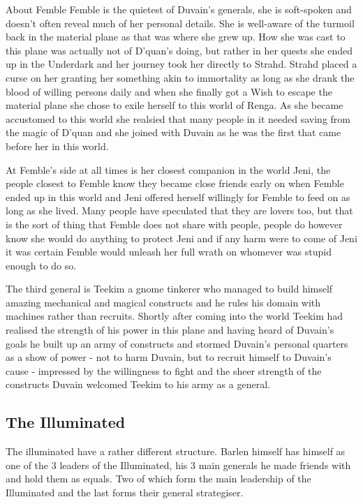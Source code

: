 \documentclass[10pt,twoside,twocolumn]{article}
\begin{document}
\begin{commentbox}{About Femble}
Femble is the quietest of Duvain's generals, she is soft-spoken and doesn't often reveal much of her personal details. She is well-aware of the turmoil back in the material plane as that was where she grew up. How she was cast to this plane was actually not of D'quan's doing, but rather in her quests she ended up in the Underdark and her journey took her directly to Strahd. Strahd placed a curse on her granting her something akin to immortality as long as she drank the blood of willing persons daily and when she finally got a Wish to escape the material plane she chose to exile herself to this world of Renga. As she became accustomed to this world she realsied that many people in it needed saving from the magic of D'quan and she joined with Duvain as he was the first that came before her in this world.

At Femble's side at all times is her closest companion in the world Jeni, the people closest to Femble know they became close friends early on when Femble ended up in this world and Jeni offered herself willingly for Femble to feed on as long as she lived. Many people have speculated that they are lovers too, but that is the sort of thing that Femble does not share with people, people do however know she would do anything to protect Jeni and if any harm were to come of Jeni it was certain Femble would unleash her full wrath on whomever was stupid enough to do so.
\end{commentbox}

The third general is Teekim a gnome tinkerer who managed to build himself amazing mechanical and magical constructs and he rules his domain with machines rather than recruits. Shortly after coming into the world Teekim had realised the strength of his power in this plane and having heard of Duvain's goals he built up an army of constructs and stormed Duvain's personal quarters as a show of power - not to harm Duvain, but to recruit himself to Duvain's cause - impressed by the willingness to fight and the sheer strength of the constructs Duvain welcomed Teekim to his army as a general.

\subsection{The Illuminated}
The illuminated have a rather different structure. Barlen himself has himself as one of the 3 leaders of the Illuminated, his 3 main generals he made friends with and hold them as equals. Two of which form the main leadership of the Illuminated and the last forms their general strategiser.
\end{document}
